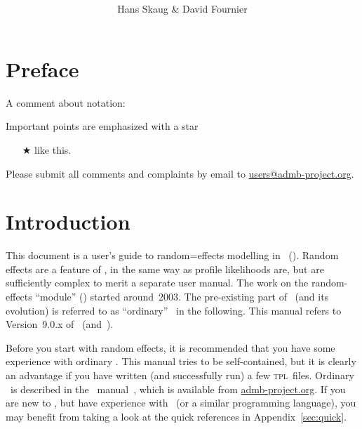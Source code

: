 \documentclass{admbmanual}
\begin{document}
\title{%
}
\author{Hans Skaug \& David Fournier}

\maketitle

\tableofcontents


\chapter*{Preface}

A comment about notation: 

Important points are emphasized with a star
\begin{itemize}
\item[$\bigstar$] like this.
\end{itemize}

Please submit all comments and complaints by email to \href{mailto:users@admb-project.org}{users@admb-project.org}.


\chapter{Introduction}

This document is a user's guide to random=effects modelling in \ADM\ (\scAB).
Random effects are a feature of \scAB, in the same way as profile likelihoods are, 
but are sufficiently complex to merit a separate user manual. The work on the random-effects ``module'' (\scAR) 
started around~2003. The pre-existing part of \scAB\ (and its evolution) is referred to as ``ordinary'' \scAB\
in the following. This manual refers to Version~9.0.x of \scAB\ (and~\scAR).

Before you start with random effects, it is recommended that you have some experience
with ordinary \scAB. This manual tries to be self-contained, but it is clearly an advantage if
you have written (and successfully run) a few \textsc{tpl}~files. Ordinary \scAB\ is described in 
the \scAB\ manual~\cite{admb_manual}, which is available from \href{mailto:admb-project.org}{admb-project.org}.
If you are new to \scAB, but have experience with \cplus\ (or a similar programming language),
you may benefit from taking a look at the quick references in Appendix~\ref{sec:quick}.
\end{document}
